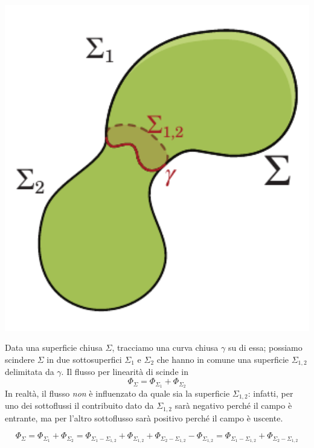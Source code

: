 \begin{observe}
	~\\
	\begin{minipage}{0.39\textwidth}
		\begin{center}
			\includegraphics[width=1\textwidth]{images/chp2/chp2oss.pdf}
		\end{center}
	\end{minipage}	
	\begin{minipage}{0.6\textwidth}	
	Data una superficie chiusa $\Sigma$, tracciamo una curva chiusa $\gamma$ su di essa; possiamo scindere $\Sigma$ in due sottosuperfici $\Sigma_1$ e $\Sigma_2$ che hanno in comune una superficie $\Sigma_{1,2}$ delimitata da $\gamma$.
	Il flusso per linearità di scinde in
	\begin{equation*}
		\Phi_{\Sigma}=\Phi_{\Sigma_1}+\Phi_{\Sigma_2}
	\end{equation*}
	In realtà, il flusso \textit{non} è influenzato da quale sia la superficie  $\Sigma_{1,2}$: infatti, per uno dei sottoflussi il contribuito dato da $ \Sigma_{1,2}$ sarà negativo perché il campo è entrante, ma per l'altro sottoflusso sarà positivo perché il campo è uscente.
\end{minipage}

\begin{equation*}
	\Phi_{\Sigma}=\Phi_{\Sigma_1}+\Phi_{\Sigma_2}=\Phi_{\Sigma_1-\Sigma_{1,2}}+\Phi_{\Sigma_{1,2}}+\Phi_{\Sigma_2-\Sigma_{1,2}}-\Phi_{\Sigma_{1,2}}=\Phi_{\Sigma_1-\Sigma_{1,2}}+\Phi_{\Sigma_2-\Sigma_{1,2}}
\end{equation*}
\end{observe}
